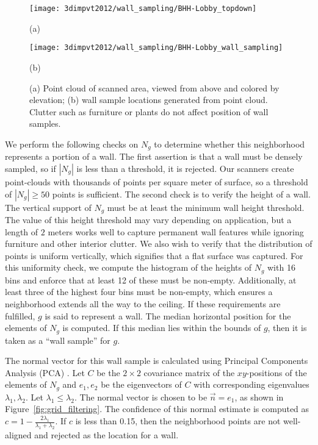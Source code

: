 \documentclass[12pt,onecolumn,oneside]{book}
\begin{document}
\begin{figure}

\begin{minipage}[b]{0.45\linewidth}
  \centering
  \centerline{\texttt{[image: 3dimpvt2012/wall\_sampling/BHH-Lobby\_topdown]}}
  \centerline{(a)}\medskip
\end{minipage}
\hfill
\begin{minipage}[b]{0.45\linewidth}
  \centering
  \centerline{\texttt{[image: 3dimpvt2012/wall\_sampling/BHH-Lobby\_wall\_sampling]}}
  \centerline{(b)}\medskip
\end{minipage}

\caption[Wall sampling from static point cloud.]{(a) Point cloud of scanned area, viewed from above and colored by elevation; (b) wall sample locations generated from point cloud.  Clutter such as furniture or plants do not affect position of wall samples.}
\label{fig:bhh_wall_sampling_example}

\end{figure}

We perform the following checks on $N_g$ to determine whether this neighborhood represents a portion of a wall.  The first assertion is that a wall must be densely sampled, so if $|N_g|$ is less than a threshold, it is rejected. Our scanners create point-clouds with thousands of points per square meter of surface, so a threshold of $|N_g| \geq 50$ points is sufficient.  The second check is to verify the height of a wall.  The vertical support of $N_g$ must be at least the minimum wall height threshold. The value of this height threshold may vary depending on application, but a length of $2$ meters works well to capture permanent wall features while ignoring furniture and other interior clutter.  We also wish to verify that the distribution of points is uniform vertically, which signifies that a flat surface was captured.  For this uniformity check, we compute the histogram of the heights of $N_g$ with 16 bins and enforce that at least 12 of these must be non-empty.  Additionally, at least three of the highest four bins must be non-empty, which ensures a neighborhood extends all the way to the ceiling.  If these requirements are fulfilled, $g$ is said to represent a wall.  The median horizontal position for the elements of $N_g$ is computed.  If this median lies within the bounds of $g$, then it is taken as a ``wall sample'' for $g$.

The normal vector for this wall sample is calculated using Principal Components Analysis (PCA) \cite{PCA}.  Let $C$ be the $2 \times 2$ covariance matrix of the $xy$-positions of the elements of $N_g$ and $e_1, e_2$ be the eigenvectors of $C$ with corresponding eigenvalues $\lambda_1, \lambda_2$.  
Let $\lambda_1 \leq \lambda_2$.  The normal vector is chosen to be $\vec{n} = e_1$, as shown in Figure~\ref{fig:grid_filtering}.  The confidence of this normal estimate is computed as $c = 1 - \frac{2 \lambda_1}{\lambda_1 + \lambda_2}$.  If $c$ is less than 0.15, then the neighborhood points are not well-aligned and rejected as the location for a wall.
\end{document}
